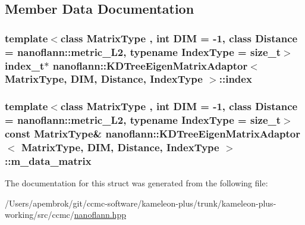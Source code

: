 \subsection{Member Data Documentation}
\hypertarget{structnanoflann_1_1_k_d_tree_eigen_matrix_adaptor_a171c13d72cca6020775ae1d15ea2f935}{
\subsubsection[{index}]{\setlength{\rightskip}{0pt plus 5cm}template$<$class Matrix\-Type , int D\-I\-M = -\/1, class Distance  = nanoflann\-::metric\-\_\-\-L2, typename Index\-Type  = size\-\_\-t$>$ {\bf index\-\_\-t}$\ast$ {\bf nanoflann\-::\-K\-D\-Tree\-Eigen\-Matrix\-Adaptor}$<$ Matrix\-Type, D\-I\-M, Distance, Index\-Type $>$\-::index}}\label{structnanoflann_1_1_k_d_tree_eigen_matrix_adaptor_a171c13d72cca6020775ae1d15ea2f935}
\hypertarget{structnanoflann_1_1_k_d_tree_eigen_matrix_adaptor_a003a066551cff2038b11efc66633d0f8}{
\subsubsection[{m\-\_\-data\-\_\-matrix}]{\setlength{\rightskip}{0pt plus 5cm}template$<$class Matrix\-Type , int D\-I\-M = -\/1, class Distance  = nanoflann\-::metric\-\_\-\-L2, typename Index\-Type  = size\-\_\-t$>$ const Matrix\-Type\& {\bf nanoflann\-::\-K\-D\-Tree\-Eigen\-Matrix\-Adaptor}$<$ Matrix\-Type, D\-I\-M, Distance, Index\-Type $>$\-::m\-\_\-data\-\_\-matrix}}\label{structnanoflann_1_1_k_d_tree_eigen_matrix_adaptor_a003a066551cff2038b11efc66633d0f8}


The documentation for this struct was generated from the following file\-:\begin{DoxyCompactItemize}
\item 
/\-Users/apembrok/git/ccmc-\/software/kameleon-\/plus/trunk/kameleon-\/plus-\/working/src/ccmc/\hyperlink{nanoflann_8hpp}{nanoflann.\-hpp}\end{DoxyCompactItemize}
